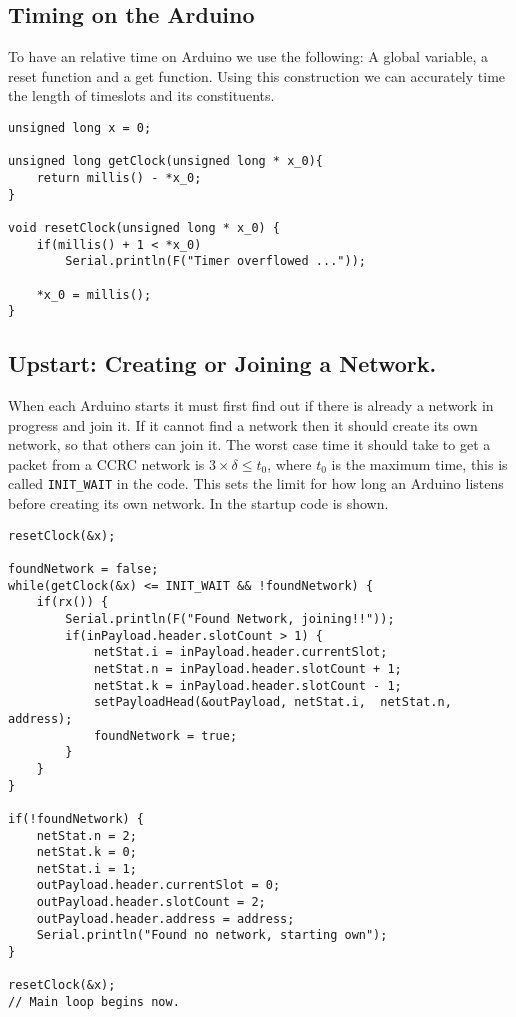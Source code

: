 \subsection{Timing on the Arduino}
To have an relative time on Arduino we use the following: A global variable, a reset function and a get function. 
Using this construction we can accurately time the length of timeslots and its constituents. 
\begin{lstlisting}[style=customc,caption={The variable and functions used to implement timing.},label={lst:ccrc:timing}]
unsigned long x = 0;

unsigned long getClock(unsigned long * x_0){
    return millis() - *x_0; 
}

void resetClock(unsigned long * x_0) {
    if(millis() + 1 < *x_0)
        Serial.println(F("Timer overflowed ..."));

    *x_0 = millis();
}
\end{lstlisting}

\subsection{Upstart: Creating or Joining a Network.}
When each Arduino starts it must first find out if there is already a network in progress and join it. 
If it cannot find a network then it should create its own network, so that others can join it. 
The worst case time it should take to get a packet from a CCRC network is $3 \times \delta \leq t_0$, where $t_0$ is the maximum time, this is called \texttt{INIT\_WAIT} in the code. 
This sets the limit for how long an Arduino listens before creating its own network. 
In  the startup code is shown. 

\begin{lstlisting}[style=customc,caption={Startup, if a network is found join it, if not create one.},label={lst:ccrc:startup}]
resetClock(&x);

foundNetwork = false;
while(getClock(&x) <= INIT_WAIT && !foundNetwork) {
    if(rx()) {
        Serial.println(F("Found Network, joining!!"));
        if(inPayload.header.slotCount > 1) {
            netStat.i = inPayload.header.currentSlot;
            netStat.n = inPayload.header.slotCount + 1;
            netStat.k = inPayload.header.slotCount - 1;
            setPayloadHead(&outPayload, netStat.i,  netStat.n, address);
            foundNetwork = true;
        }
    }
}

if(!foundNetwork) {
    netStat.n = 2;
    netStat.k = 0;
    netStat.i = 1; 
    outPayload.header.currentSlot = 0;
    outPayload.header.slotCount = 2;
    outPayload.header.address = address;
    Serial.println("Found no network, starting own");
}

resetClock(&x);
// Main loop begins now.
\end{lstlisting}

